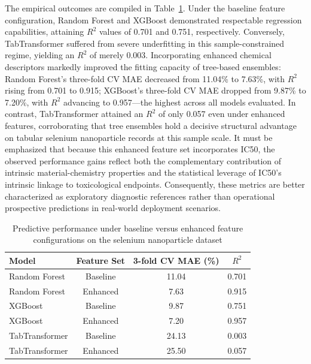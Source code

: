 The empirical outcomes are compiled in Table~\ref{tab:senp_main_results}. Under the baseline feature configuration, Random Forest and XGBoost demonstrated respectable regression capabilities, attaining $R^2$ values of 0.701 and 0.751, respectively. Conversely, TabTransformer suffered from severe underfitting in this sample-constrained regime, yielding an $R^2$ of merely 0.003. Incorporating enhanced chemical descriptors markedly improved the fitting capacity of tree-based ensembles: Random Forest's three-fold CV MAE decreased from 11.04\% to 7.63\%, with $R^2$ rising from 0.701 to 0.915; XGBoost's three-fold CV MAE dropped from 9.87\% to 7.20\%, with $R^2$ advancing to 0.957—the highest across all models evaluated. In contrast, TabTransformer attained an $R^2$ of only 0.057 even under enhanced features, corroborating that tree ensembles hold a decisive structural advantage on tabular selenium nanoparticle records at this sample scale. It must be emphasized that because this enhanced feature set incorporates IC50, the observed performance gains reflect both the complementary contribution of intrinsic material-chemistry properties and the statistical leverage of IC50's intrinsic linkage to toxicological endpoints. Consequently, these metrics are better characterized as exploratory diagnostic references rather than operational prospective predictions in real-world deployment scenarios.

\begin{table}[htbp]
  \centering
  \caption{Predictive performance under baseline versus enhanced feature configurations on the selenium nanoparticle dataset}
  \label{tab:senp_main_results}
  \begin{tabular}{lccc}
    \hline
    Model & Feature Set & 3-fold CV MAE (\%) & $R^2$ \\
    \hline
    Random Forest & Baseline & 11.04 & 0.701 \\
    Random Forest & Enhanced & 7.63 & 0.915 \\
    XGBoost & Baseline & 9.87 & 0.751 \\
    XGBoost & Enhanced & 7.20 & 0.957 \\
    TabTransformer & Baseline & 24.13 & 0.003 \\
    TabTransformer & Enhanced & 25.50 & 0.057 \\
    \hline
  \end{tabular}
\end{table}

